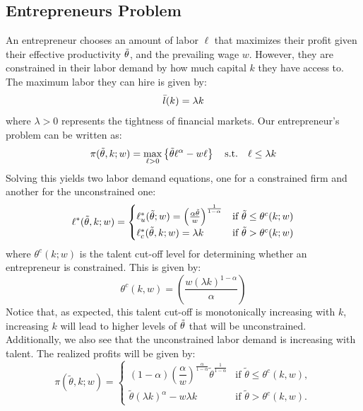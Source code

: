 \subsection{Entrepreneurs Problem}

    An entrepreneur chooses an amount of labor $\ell$ that maximizes their profit given their effective productivity $\Tilde{\theta}$, and the prevailing wage $w$. However, they are constrained in their labor demand by how much capital $k$ they have access to. The maximum labor they can hire is given by:
    \begin{equation}
        \Bar{l}(k) = \lambda k
    \end{equation}
    where $\lambda > 0$ represents the tightness of financial markets. Our entrepreneur's problem can be written as:
    \begin{equation}
        \pi(\Tilde{\theta}, k ; w) = \max_{\ell >0} \left\{ \Tilde{\theta} \ell^\alpha - w \ell \right\} \quad \text{s.t.} \quad \ell \leq \lambda k
    \end{equation}
    Solving this yields two labor demand equations, one for a constrained firm and another for the unconstrained one:
    \begin{equation} \label{eq:labordemand}
        \ell^*(\Tilde{\theta}, k ; w) = \begin{cases}
                \ell^*_u(\Tilde{\theta}; w) = \left(\frac{\alpha \Tilde{\theta}}{w}\right)^{\frac{1}{1-\alpha}} & \text{if }\Tilde{\theta} \leq \theta^c(k; w) \\
                \ell^*_c(\Tilde{\theta}, k ; w) = \lambda k & \text{if }\Tilde{\theta} > \theta^c(k; w)
            \end{cases}
    \end{equation}
    where $\theta^c(k; w)$ is the talent cut-off level for determining whether an entrepreneur is constrained. This is given by:
    \begin{equation}
             {\theta^c}(k, w) = \left(\frac{w(\lambda k)^{1-\alpha}}{\alpha}\right)
    \end{equation}
    Notice that, as expected, this talent cut-off is monotonically increasing with $k$, increasing $k$ will lead to higher levels of $\Tilde{\theta}$ that will be unconstrained. Additionally, we also see that the unconstrained labor demand is increasing with talent. 
    The realized profits will be given by:
    \begin{equation}
\pi(\tilde{\theta}, k; w) = \begin{cases}
(1-\alpha) \left( \dfrac{\alpha}{w} \right)^{\frac{\alpha}{1-\alpha}} \tilde{\theta}^{\frac{1}{1-\alpha}} & \text{if } \tilde{\theta} \leq {\theta^c}(k,w), \\
\tilde{\theta}(\lambda k)^\alpha - w\lambda k & \text{if } \tilde{\theta} > {\theta^c}(k,w).
\end{cases}
\end{equation}

